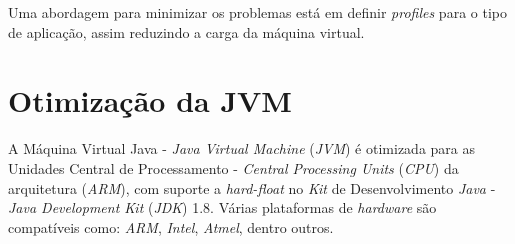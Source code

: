 Uma abordagem para minimizar os problemas está em definir \textit{profiles} 
para o tipo de aplicação, assim reduzindo a carga da máquina virtual.

\section{Otimização da JVM}

A Máquina Virtual Java - \textit{Java Virtual Machine} (\textit{JVM}) é 
otimizada para as Unidades Central de Processamento - \textit{Central 
Processing Units} (\textit{CPU}) da arquitetura (\textit{ARM}), com suporte a 
\textit{hard-float} no \textit{Kit} de Desenvolvimento \textit{Java} - 
\textit{Java Development Kit} (\textit{JDK}) 1.8. Várias plataformas de 
\textit{hardware} são compatíveis como: \textit{ARM}, \textit{Intel}, 
\textit{Atmel}, dentro outros.
